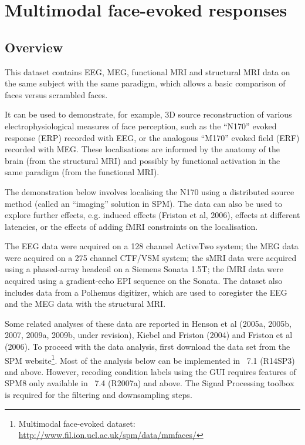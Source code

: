 \chapter{Multimodal face-evoked responses \label{Chap:data:multimodal}}

\section{Overview}

This dataset contains EEG, MEG, functional MRI and structural MRI data on the same subject with the same paradigm, which allows a basic comparison of faces versus scrambled faces.

It can be used to demonstrate, for example, 3D source reconstruction of various electrophysiological measures of face perception, such as the ``N170'' evoked response (ERP) recorded with EEG, or the analogous ``M170'' evoked field (ERF) recorded with MEG. These localisations are informed by the anatomy of the brain (from the structural MRI) and possibly by functional activation in the same paradigm (from the functional MRI).

The demonstration below involves localising the N170 using a distributed source method (called an ``imaging'' solution in SPM). The data can also be used to explore further effects, e.g. induced effects (Friston et al, 2006), effects at different latencies, or the effects of adding fMRI constraints on the localisation.

The EEG data were acquired on a 128 channel ActiveTwo system; the MEG data were acquired on a 275 channel CTF/VSM system; the sMRI data were acquired using a phased-array headcoil on a Siemens Sonata 1.5T; the fMRI data were acquired using a gradient-echo EPI sequence on the Sonata. The dataset also includes data from a Polhemus digitizer, which are used to coregister the EEG and the MEG data with the structural MRI.

Some related analyses of these data are reported in Henson et al (2005a, 2005b, 2007, 2009a, 2009b, under revision), Kiebel and Friston (2004) and Friston et al (2006). To proceed with the data analysis, first download the  data set from the SPM website\footnote{Multimodal face-evoked dataset: \url{http://www.fil.ion.ucl.ac.uk/spm/data/mmfaces/}}.
Most of the analysis below can be implemented in \matlab\ 7.1 (R14SP3) and above. However, recoding condition labels using the GUI requires features of SPM8 only available in \matlab\ 7.4 (R2007a) and above. The Signal Processing toolbox is required for the filtering and downsampling steps.


